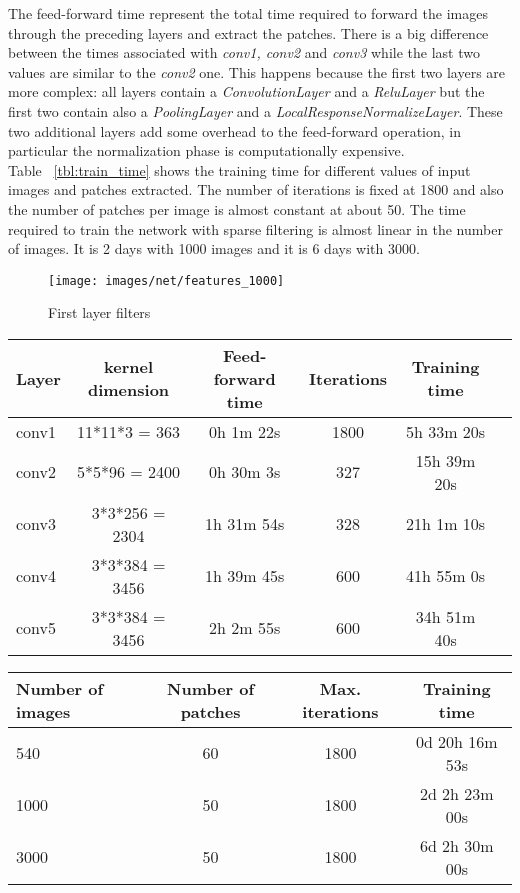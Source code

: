 The feed-forward time represent the total time required to forward the images through the preceding layers and extract the patches. There is a big difference between the times associated with \textit{conv1, conv2} and \textit{conv3} while the last two values are similar to the \textit{conv2} one. This happens because the first two layers are more complex: all layers contain a \textit{ConvolutionLayer} and a \textit{ReluLayer} but the first two contain also a \textit{PoolingLayer} and a \textit{LocalResponseNormalizeLayer}. These two additional layers add some overhead to the feed-forward operation, in particular the normalization phase is computationally expensive.\\

Table ~\ref{tbl:train_time} shows the training time for different values of input images and patches extracted. The number of iterations is fixed at 1800 and also the number of patches per image is almost constant at about 50. The time required to train the network with sparse filtering is almost linear in the number of images. It is 2 days with 1000 images and it is 6 days with 3000.

\begin{figure}[h!]\centering
    \texttt{[image: images/net/features\_1000]}
    \caption{First layer filters}
    \label{fig:filters}
\end{figure}


\begin{table*}[htbp]
\caption{Training time per layer}
\centering
\begin{tabular}{lccccc}
    Layer       & kernel dimension & Feed-forward time & Iterations & Training time \\
    \midrule
    conv1        & 11*11*3 = 363  & 0h 1m 22s & 1800  & 5h 33m 20s \\
    conv2     & 5*5*96 = 2400  & 0h 30m 3s & 327 & 15h 39m 20s \\
    conv3          & 3*3*256 = 2304 & 1h 31m 54s & 328 & 21h 1m 10s \\
    conv4        & 3*3*384 = 3456 & 1h 39m 45s & 600 & 41h 55m 0s \\
    conv5          & 3*3*384 = 3456  & 2h 2m 55s & 600 & 34h 51m 40s \\
\end{tabular}
\label{tbl:train_time_per_layer}
\end{table*}

\begin{table*}[htbp]
\caption{Total training time (unsupervised only)}
\centering
\begin{tabular}{lccc}
    Number of images  & Number of patches & Max. iterations & Training time \\
    \midrule
    540 & 60 &1800 & 0d 20h 16m 53s \\
    1000 & 50 & 1800 & 2d 2h 23m 00s \\
    3000 & 50 & 1800 & 6d 2h 30m 00s \\
\end{tabular}
\label{tbl:train_time}
\end{table*}

